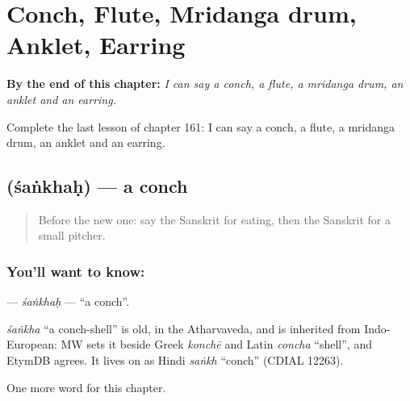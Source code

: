 
\chapter{Conch, Flute, Mridanga drum, Anklet, Earring}
\label{ch:sa-conch-flute-mridanga-drum-anklet-earring}

\begin{chapteropening}
\textbf{By the end of this chapter:} \emph{I can say a conch, a flute, a mridanga drum, an anklet and an earring.}

Complete the last lesson of chapter 161: I can say a conch, a flute, a mridanga drum, an anklet and an earring.
\end{chapteropening}

\section[\texorpdfstring{\sk{शंखः} (śaṅkhaḥ)}{शंखः (śaṅkhaḥ)}]{ (śaṅkhaḥ) — a conch}

\label{lesson:SA-C161-sankhah}



\begin{quote}
Before the new one: say the Sanskrit for eating, then the Sanskrit for a small pitcher.
\end{quote}

\subsection*{You'll want to know: }
\textbf{} — \emph{śaṅkhaḥ} — \textquotedblleft{}a conch\textquotedblright{}.

\begin{cousinweb}
\emph{śaṅkha} \textquotedblleft{}a conch-shell\textquotedblright{} is old, in the Atharvaveda, and is inherited from Indo-European: MW sets it beside Greek \emph{konchē} and Latin \emph{concha} \textquotedblleft{}shell\textquotedblright{}, and EtymDB agrees. It lives on as Hindi \emph{saṅkh} \textquotedblleft{}conch\textquotedblright{} (CDIAL 12263).
\end{cousinweb}

\begin{grammarlens}[title={What you've built}]
One more word for this chapter.
\end{grammarlens}

